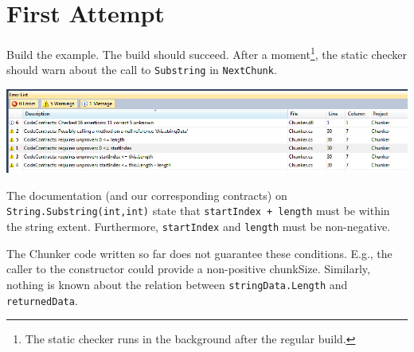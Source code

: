 \documentclass{article}
\newcommand{\code}[1]{\lstinline{#1}}
\begin{document}
\section{First Attempt}
Build the example. The build should succeed. After a
moment\footnote{The static checker runs in the background after the regular build.}, 
the static checker should warn about the call to \code{Substring} in \code{NextChunk}.
\begin{center}
  \includegraphics[width=1\columnwidth]{errors1.png}
\end{center}
The documentation (and our corresponding contracts) on
\code{String.Substring(int,int)} state that \code{startIndex +
length} must be within the string extent. Furthermore,
\code{startIndex} and \code{length} must be non-negative.

The Chunker code written so far does not guarantee these
conditions. E.g., the caller to the constructor could provide a
non-positive chunkSize. Similarly, nothing is known about the relation
between \code{stringData.Length} and \code{returnedData}.
\end{document}

